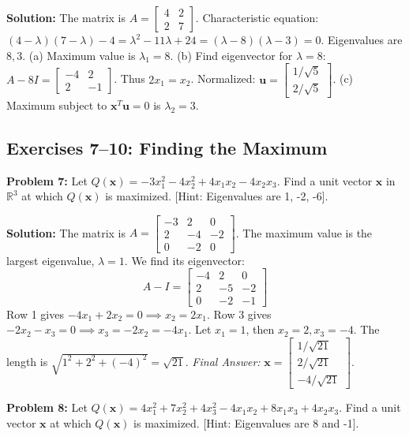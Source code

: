 \documentclass[11pt, letterpaper]{article}
\theoremstyle{definition}
\theoremstyle{remark}
\newcommand{\R}{\mathbb{R}}
\begin{document}
\textbf{Solution:}
The matrix is $A = \begin{bmatrix} 4 & 2 \\ 2 & 7 \end{bmatrix}$.
Characteristic equation: $(4-\lambda)(7-\lambda) - 4 = \lambda^2 - 11\lambda + 24 = (\lambda-8)(\lambda-3) = 0$. Eigenvalues are $8, 3$.
(a) Maximum value is $\lambda_1 = 8$.
(b) Find eigenvector for $\lambda = 8$: $A - 8I = \begin{bmatrix} -4 & 2 \\ 2 & -1 \end{bmatrix}$. Thus $2x_1 = x_2$. Normalized: $\mathbf{u} = \begin{bmatrix} 1/\sqrt{5} \\ 2/\sqrt{5} \end{bmatrix}$.
(c) Maximum subject to $\mathbf{x}^T\mathbf{u}=0$ is $\lambda_2 = 3$.

\subsection{Exercises 7--10: Finding the Maximum}

\textbf{Problem 7:} Let $Q(\mathbf{x}) = -3x_1^2 - 4x_2^2 + 4x_1x_2 - 4x_2x_3$. Find a unit vector $\mathbf{x}$ in $\R^3$ at which $Q(\mathbf{x})$ is maximized. [Hint: Eigenvalues are 1, -2, -6].

\textbf{Solution:}
The matrix is $A = \begin{bmatrix} -3 & 2 & 0 \\ 2 & -4 & -2 \\ 0 & -2 & 0 \end{bmatrix}$.
The maximum value is the largest eigenvalue, $\lambda = 1$. We find its eigenvector:
\[ A - I = \begin{bmatrix} -4 & 2 & 0 \\ 2 & -5 & -2 \\ 0 & -2 & -1 \end{bmatrix} \]
Row 1 gives $-4x_1 + 2x_2 = 0 \implies x_2 = 2x_1$. Row 3 gives $-2x_2 - x_3 = 0 \implies x_3 = -2x_2 = -4x_1$. Let $x_1 = 1$, then $x_2 = 2, x_3 = -4$. The length is $\sqrt{1^2 + 2^2 + (-4)^2} = \sqrt{21}$.
\textit{Final Answer:} $\mathbf{x} = \begin{bmatrix} 1/\sqrt{21} \\ 2/\sqrt{21} \\ -4/\sqrt{21} \end{bmatrix}$.

\vspace{1em}
\textbf{Problem 8:} Let $Q(\mathbf{x}) = 4x_1^2 + 7x_2^2 + 4x_3^2 - 4x_1x_2 + 8x_1x_3 + 4x_2x_3$. Find a unit vector $\mathbf{x}$ at which $Q(\mathbf{x})$ is maximized. [Hint: Eigenvalues are 8 and -1].
\end{document}
